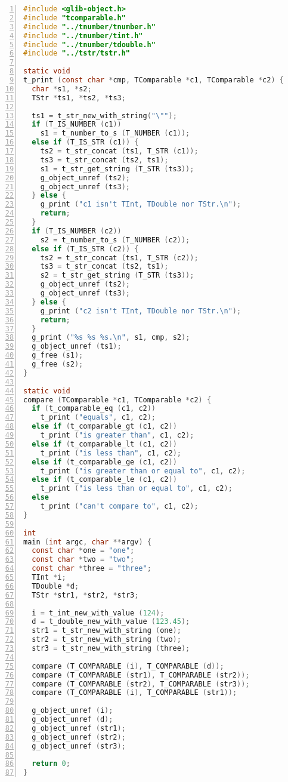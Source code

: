 \begin{lstlisting}[language=C, numbers=left]
#include <glib-object.h>
#include "tcomparable.h"
#include "../tnumber/tnumber.h"
#include "../tnumber/tint.h"
#include "../tnumber/tdouble.h"
#include "../tstr/tstr.h"

static void
t_print (const char *cmp, TComparable *c1, TComparable *c2) {
  char *s1, *s2;
  TStr *ts1, *ts2, *ts3;

  ts1 = t_str_new_with_string("\"");
  if (T_IS_NUMBER (c1))
    s1 = t_number_to_s (T_NUMBER (c1));
  else if (T_IS_STR (c1)) {
    ts2 = t_str_concat (ts1, T_STR (c1));
    ts3 = t_str_concat (ts2, ts1);
    s1 = t_str_get_string (T_STR (ts3));
    g_object_unref (ts2);
    g_object_unref (ts3);
  } else {
    g_print ("c1 isn't TInt, TDouble nor TStr.\n");
    return;
  }
  if (T_IS_NUMBER (c2))
    s2 = t_number_to_s (T_NUMBER (c2));
  else if (T_IS_STR (c2)) {
    ts2 = t_str_concat (ts1, T_STR (c2));
    ts3 = t_str_concat (ts2, ts1);
    s2 = t_str_get_string (T_STR (ts3));
    g_object_unref (ts2);
    g_object_unref (ts3);
  } else {
    g_print ("c2 isn't TInt, TDouble nor TStr.\n");
    return;
  }
  g_print ("%s %s %s.\n", s1, cmp, s2);
  g_object_unref (ts1);
  g_free (s1);
  g_free (s2);
}    

static void
compare (TComparable *c1, TComparable *c2) {
  if (t_comparable_eq (c1, c2))
    t_print ("equals", c1, c2);
  else if (t_comparable_gt (c1, c2))
    t_print ("is greater than", c1, c2);
  else if (t_comparable_lt (c1, c2))
    t_print ("is less than", c1, c2);
  else if (t_comparable_ge (c1, c2))
    t_print ("is greater than or equal to", c1, c2);
  else if (t_comparable_le (c1, c2))
    t_print ("is less than or equal to", c1, c2);
  else
    t_print ("can't compare to", c1, c2);
}

int
main (int argc, char **argv) {
  const char *one = "one";
  const char *two = "two";
  const char *three = "three";
  TInt *i;
  TDouble *d;
  TStr *str1, *str2, *str3;

  i = t_int_new_with_value (124);
  d = t_double_new_with_value (123.45);
  str1 = t_str_new_with_string (one);
  str2 = t_str_new_with_string (two);
  str3 = t_str_new_with_string (three);

  compare (T_COMPARABLE (i), T_COMPARABLE (d));
  compare (T_COMPARABLE (str1), T_COMPARABLE (str2));
  compare (T_COMPARABLE (str2), T_COMPARABLE (str3));
  compare (T_COMPARABLE (i), T_COMPARABLE (str1));

  g_object_unref (i);
  g_object_unref (d);
  g_object_unref (str1);
  g_object_unref (str2);
  g_object_unref (str3);

  return 0;
}
\end{lstlisting}

